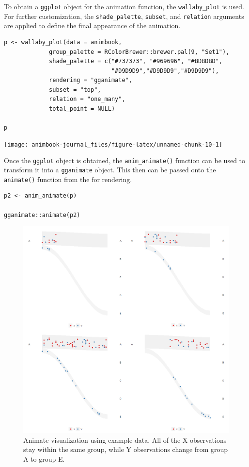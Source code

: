 To obtain a \texttt{ggplot} object for the animation function, the \texttt{wallaby\_plot} is used. For further customization, the \texttt{shade\_palette}, \texttt{subset}, and \texttt{relation} arguments are applied to define the final appearance of the animation.

\begin{verbatim}
p <- wallaby_plot(data = animbook,
             group_palette = RColorBrewer::brewer.pal(9, "Set1"),
             shade_palette = c("#737373", "#969696", "#BDBDBD",
                               "#D9D9D9","#D9D9D9","#D9D9D9"),
             rendering = "gganimate",
             subset = "top",
             relation = "one_many",
             total_point = NULL)

p
\end{verbatim}

\begin{center}\texttt{[image: animbook-journal\_files/figure-latex/unnamed-chunk-10-1]} \end{center}

Once the \texttt{ggplot} object is obtained, the \texttt{anim\_animate()} function can be used to transform it into a \texttt{gganimate} object. This then can be passed onto the \texttt{animate()} function from the  for rendering.

\begin{verbatim}
p2 <- anim_animate(p)

gganimate::animate(p2)
\end{verbatim}

\begin{figure}

{\centering \includegraphics[width=1\linewidth]{figures/animation-example} 

}

\caption{Animate visualization using example data. All of the X observations stay within the same group, while Y observations change from group A to group E.}\label{fig:catchange-figure}
\end{figure}

